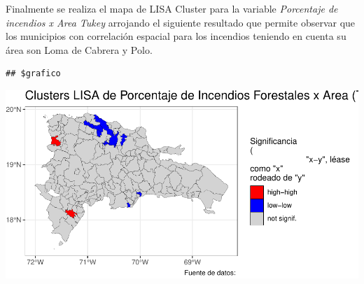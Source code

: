 \documentclass[11pt,]{article}
\begin{document}
Finalmente se realiza el mapa de LISA Cluster para la variable
\emph{Porcentaje de incendios x Area Tukey} arrojando el siguiente
resultado que permite observar que los municipios con correlación
espacial para los incendios teniendo en cuenta su área son Loma de
Cabrera y Polo.

\begin{verbatim}
## $grafico
\end{verbatim}

\includegraphics{proyecto_files/figure-latex/unnamed-chunk-29-1.pdf}
\end{document}
